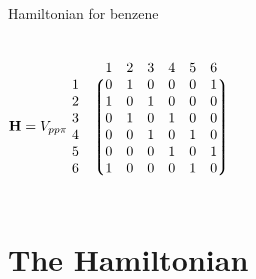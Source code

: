\documentclass[hyperref={colorlinks=true,urlcolor=blue,linkcolor=.},aspectratio=1610,mathserif]{beamer}
\begin{document}
\begin{frame}{Hamiltonian for benzene}
	\centering
	\begin{columns}[c]
		\begin{align}
			\mqty{                            \\ \\ \\ \vb{H} = V_{pp\pi}\\ \\ \\} \ \mqty{						&  \mqty{1 & 2 & 3 & 4 & 5 & 6} \\
				\mqty{1                           \\ 2 \\ 3 \\ 4 \\ 5 \\ 6} &	\mqty*(0 & 1 & 0 & 0 & 0 & 1 \\
			1 & 0 & 1 & 0 & 0 & 0             \\
			0 & 1 & 0 & 1 & 0 & 0             \\
			0 & 0 & 1 & 0 & 1 & 0             \\
			0 & 0 & 0 & 1 & 0 & 1             \\
			1 & 0 & 0 & 0 & 1 & 0)} \nonumber
		\end{align}
	\end{columns}
\end{frame}

\section{The Hamiltonian}
\end{document}
